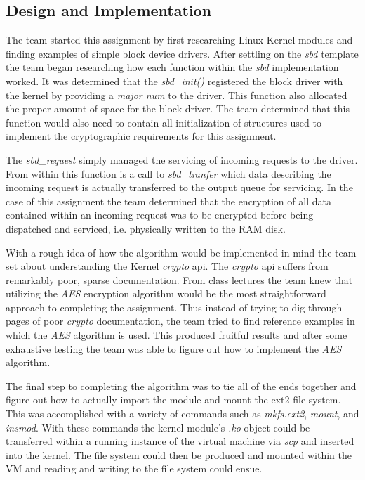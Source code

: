 \documentclass[10pt,onecolumn,draftclsnofoot]{IEEEtran} %
\begin{document}
\newpage
\begin{singlespace}
\section{\bf  Design and Implementation}

  \normalfont \indent The team started this assignment by first researching Linux Kernel modules and finding examples of simple block device drivers. After settling on the \textit{sbd} template the team began researching how each function within the \textit{sbd} implementation worked. It was determined that the \textit{sbd\_init()} registered the block driver with the kernel by providing a \textit{major num} to the driver. This function also allocated the proper amount of space for the block driver. The team determined that this function would also need to contain all initialization of structures used to implement the cryptographic requirements for this assignment.

  \normalfont \indent The \textit{sbd\_request} simply managed the servicing of incoming requests to the driver. From within this function is a call to \textit{sbd\_tranfer} which data describing the incoming request is actually transferred to the output queue for servicing. In the case of this assignment the team determined that the encryption of all data contained within an incoming request was to be encrypted before being dispatched and serviced, i.e. physically written to the RAM disk. 


   \normalfont \indent With a rough idea of how the algorithm would be implemented in mind the team set about understanding the Kernel \textit{crypto} api. The \textit{crypto} api suffers from remarkably poor, sparse documentation. From class lectures the team knew that utilizing the \textit{AES} encryption algorithm would be the most straightforward approach to completing the assignment. Thus instead of trying to dig through pages of poor \textit{crypto} documentation, the team tried to find reference examples in which the \textit{AES} algorithm is used. This produced fruitful results and after some exhaustive testing the team was able to figure out how to implement the \textit{AES} algorithm.  

   \normalfont \indent The final step to completing the algorithm was to tie all of the ends together and figure out how to actually import the module and mount the ext2 file system. This was accomplished with a variety of commands such as \textit{mkfs.ext2}, \textit{mount}, and \textit{insmod}. With these commands the kernel module's \textit{.ko} object could be transferred within a running instance of the virtual machine via \textit{scp} and inserted into the kernel. The file system could then be produced and mounted within the VM and reading and writing to the file system could ensue. 


\end{singlespace}
\end{document}
